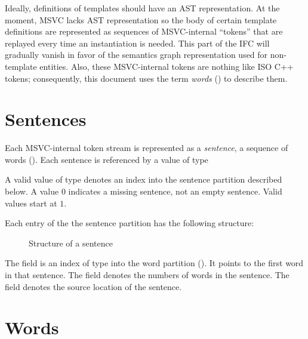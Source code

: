 \label{sec:ifc-token-streams}

Ideally, definitions of templates should have an AST representation.
At the moment, MSVC lacks AST representation so the body of certain 
template definitions are represented as sequences of 
MSVC-internal ``tokens'' that are replayed every time an
instantiation is needed.  This part of the IFC will gradually vanish
in favor of the semantics graph representation used for non-template
entities.  Also, these MSVC-internal tokens are nothing like ISO C++ tokens;
consequently, this document uses the term \emph{words} ()
to describe them.

\section{Sentences}
\label{sec:ifc-sentence}

Each MSVC-internal token stream is represented as a \emph{sentence}, a sequence of words ().
Each sentence is referenced by a value of type 

A valid value of type  denotes an index into the sentence partition
described below.  A  value $0$ indicates a missing sentence, not
an empty sentence.  Valid  values start at $1$.

Each entry of the the sentence partition has the following structure:
%
\begin{figure}[H]
	\centering
	\caption{Structure of a sentence}
	\label{fig:ifc-sentence-structure}
\end{figure}
%
The  field is an index of type 
into the word partition  ().
It points to the first word in that sentence.  
The  field denotes the numbers of words in the sentence.
The  field denotes the source location of the sentence.




\section{Words}
\label{sec:ifc-words}

